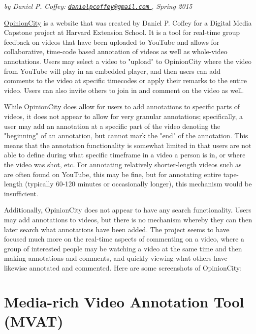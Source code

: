 \textit{by Daniel P. Coffey: \href{mailto:danielpcoffey@gmail.com}{\nolinkurl{danielpcoffey@gmail.com} }, Spring 2015}

\href{http://opinion.city}{OpinionCity} is a website that was created by Daniel P. Coffey for a Digital Media Capstone project at Harvard Extension School.  It is a tool for real-time group feedback on videos that have been uploaded to YouTube and allows for collaborative, time-code based annotation of videos as well as whole-video annotations.  Users may select a video to "upload" to OpinionCity where the video from YouTube will play in an embedded player, and then users can add comments to the video at specific timecodes or apply their remarks to the entire video.  Users can also invite others to join in and comment on the video as well. 

While OpinionCity does allow for users to add annotations to specific parts of videos, it does not appear to allow for very granular annotations; specifically, a user may add an annotation at a specific part of the video denoting the "beginning" of an annotation, but cannot mark the "end" of the annotation.  This means that the annotation functionality is somewhat limited in that users are not able to define during what specific timeframe in a video a person is in, or where the video was shot, etc.  For annotating relatively shorter-length videos such as are often found on YouTube, this may be fine, but for annotating entire tape-length (typically 60-120 minutes or occasionally longer), this mechanism would be insufficient. 

Additionally, OpinionCity does not appear to have any search functionality.  Users may add annotations to videos, but there is no mechanism whereby they can then later search what annotations have been added.  The project seems to have focused much more on the real-time aspects of commenting on a video, where a group of interested people may be watching a video at the same time and then making annotations and comments, and quickly viewing what others have likewise annotated and commented.  Here are some screenshots of OpinionCity:



\section{Media-rich Video Annotation Tool (MVAT)}
\label{sec:priorwork:media-rich-video-annotation-tool}


